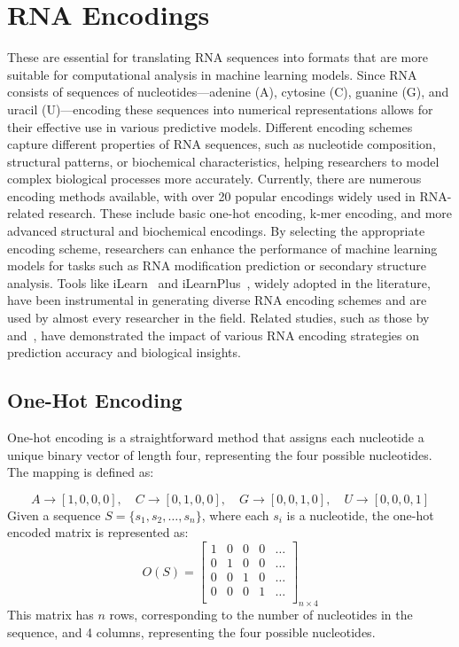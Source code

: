 \section{RNA Encodings}\label{sec:encodings}
  These are essential for translating RNA sequences into formats that are more suitable for computational analysis in machine learning models.
  Since RNA consists of sequences of nucleotides—adenine (A), cytosine (C), guanine (G), and uracil (U)—encoding these sequences into numerical representations allows for their effective use in various predictive models.
  Different encoding schemes capture different properties of RNA sequences, such as nucleotide composition, structural patterns, or biochemical characteristics, helping researchers to model complex biological processes more accurately.
  Currently, there are numerous encoding methods available, with over 20 popular encodings widely used in RNA-related research.
  These include basic one-hot encoding, k-mer encoding, and more advanced structural and biochemical encodings.
  By selecting the appropriate encoding scheme, researchers can enhance the performance of machine learning models for tasks such as RNA modification prediction or secondary structure analysis.
  Tools like iLearn~\cite{chen_ilearn_2020} and iLearnPlus~\cite{chen_ilearnplus_2021}, widely adopted in the literature, have been instrumental in generating diverse RNA encoding schemes and are used by almost every researcher in the field.
  Related studies, such as those by~\cite{chen_comprehensive_2020} and~\cite{wang_brief_2022}, have demonstrated the impact of various RNA encoding strategies on prediction accuracy and biological insights.

  \subsection{One-Hot Encoding}\label{subsec:binary}
    One-hot encoding is a straightforward method that assigns each nucleotide a unique binary vector of length four, representing the four possible nucleotides.
    The mapping is defined as:

    \[
      A \rightarrow [1, 0, 0, 0], \quad
      C \rightarrow [0, 1, 0, 0], \quad
      G \rightarrow [0, 0, 1, 0], \quad
      U \rightarrow [0, 0, 0, 1]
    \]
    Given a sequence $S = \{s_1, s_2, \dots, s_n\}$, where each $s_i$ is a nucleotide, the one-hot encoded matrix is represented as:
    \[
      O(S) = \begin{bmatrix}
               1 & 0 & 0 & 0 & \dots \\
               0 & 1 & 0 & 0 & \dots \\
               0 & 0 & 1 & 0 & \dots \\
               0 & 0 & 0 & 1 & \dots \\
      \end{bmatrix}_{n \times 4}
    \]
    This matrix has $n$ rows, corresponding to the number of nucleotides in the sequence, and 4 columns, representing the four possible nucleotides.

